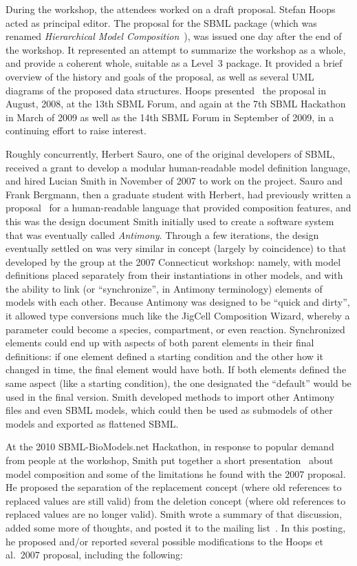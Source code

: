 During the workshop, the attendees worked on a draft proposal.  Stefan
Hoops acted as principal editor.  The proposal for the SBML package
(which was renamed \emph{Hierarchical Model
  Composition}~\citep{hoops:2007}), was issued one day after the end of
the workshop.  It represented an attempt to summarize the workshop as a
whole, and provide a coherent whole, suitable as a Level~3 package.  It
provided a brief overview of the history and goals of the proposal, as
well as several UML diagrams of the proposed data structures.  Hoops
presented~\citep{hoops:2008} the proposal in August, 2008, at the 13th
SBML Forum, and again at the 7th SBML Hackathon in March of 2009 as well
as the 14th SBML Forum in September of 2009, in a continuing effort to
raise interest.

Roughly concurrently, Herbert Sauro, one of the original developers of
SBML, received a grant to develop a modular human-readable model
definition language, and hired Lucian Smith in November of 2007 to work
on the project.  Sauro and Frank Bergmann, then a graduate student with
Herbert, had previously written a proposal~\citep{bergmann:2006} for a
human-readable language that provided composition features, and this was
the design document Smith initially used to create a software system
that was eventually called \emph{Antimony}. Through a few iterations,
the design eventually settled on was very similar in concept (largely by
coincidence) to that developed by the group at the 2007 Connecticut
workshop: namely, with model definitions placed separately from their
instantiations in other models, and with the ability to link (or
``synchronize'', in Antimony terminology) elements of models with each
other.  Because Antimony was designed to be ``quick and dirty'', it
allowed type conversions much like the JigCell Composition Wizard,
whereby a parameter could become a species, compartment, or even
reaction.  Synchronized elements could end up with aspects of both
parent elements in their final definitions: if one element defined a
starting condition and the other how it changed in time, the final
element would have both.  If both elements defined the same aspect (like
a starting condition), the one designated the ``default'' would be used
in the final version.  Smith developed methods to import other Antimony
files and even SBML models, which could then be used as submodels of
other models and exported as flattened SBML.

At the 2010 SBML-BioModels.net Hackathon, in response to popular demand
from people at the workshop, Smith put together a short
presentation~\citep{smith:2010} about model composition and some of the
limitations he found with the 2007 proposal.  He proposed the separation
of the replacement concept (where old references to replaced values are
still valid) from the deletion concept (where old references to replaced
values are no longer valid).  Smith wrote a summary of that discussion,
added some more of thoughts, and posted it to the
 mailing
list~\citep{smith:2010b}.  In this posting, he proposed and/or reported
several possible modifications to the Hoops et al.\ 2007 proposal,
including the following:

